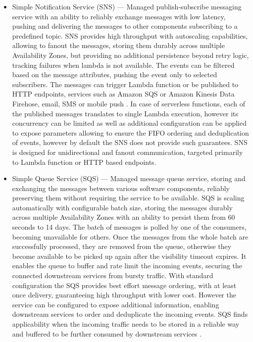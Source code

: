 \begin{itemize}
   \item Simple Notification Service (SNS) ---
   Managed publish-subscribe messaging service with an ability to reliably exchange messages with low latency, pushing and delivering the messages to other components subscribing to a predefined topic.
   SNS provides high throughput with autoscaling capabilities, allowing to fanout the messages, storing them durably across multiple Availability Zones, but providing no additional persistence beyond retry logic, tracking failures when lambda is not available.
   The events can be filtered based on the message attributes, pushing the event only to selected subscribers.   
   The messages can trigger Lambda function or be published to HTTP endpoints, services such as Amazon SQS or Amazon Kinesis Data Firehose, email, SMS or mobile push \cite{ChoosingEventsQueuesTopicsAndStreamsInYourServerlessApplication}.
   In case of serverless functions, each of the published messages translates to single Lambda execution, however its concurrency can be limited as well as additional configuration can be applied to expose parameters allowing to ensure the FIFO ordering and deduplication of events, however by default the SNS does not provide such guarantees.
   SNS is designed for unidirectional and fanout communication, targeted primarily to Lambda function or HTTP based endpoints.

   \item Simple Queue Service (SQS) ---
   Managed message queue service, storing and exchanging the messages between various software components, reliably preserving them without requiring the service to be available.
   SQS is scaling automatically with configurable batch size, storing the messages durably across multiple Availability Zones with an ability to persist them from 60 seconds to 14 days.
   The batch of messages is polled by one of the consumers, becoming unavailable for others. Once the messages from the whole batch are successfully processed, they are removed from the queue, otherwise they become available to be picked up again after the visibility timeout expires.
   It enables the queue to buffer and rate limit the incoming events, securing the connected downstream services from bursty traffic.
   With standard configuration the SQS provides best effort message ordering, with at least once delivery, guaranteeing high throughput with lower cost. However the service can be configured to expose additional information, enabling downstream services to order and deduplicate the incoming events.
   SQS finds applicability when the incoming traffic needs to be stored in a reliable way and buffered to be further consumed by downstream services \cite{AWSReinventScalableServerlessEventDrivenArchitecturesWithSNSSQSLambda}.


\end{itemize}
